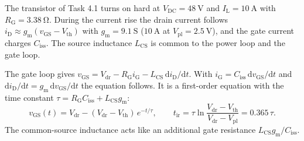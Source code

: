 The transistor of Task 4.1 turns on hard at $V_\mathrm{DC}=\SI{48}{\volt}$ and $I_\mathrm{L}=\SI{10}{\ampere}$ with $R_\mathrm{G}=\SI{3.38}{\ohm}$. During the current rise the drain current follows $i_\mathrm{D}\approx g_\mathrm{m}(v_\mathrm{GS}-V_\mathrm{th})$ with $g_\mathrm{m}=\SI{9.1}{\siemens}$ ($\SI{10}{\ampere}$ at $V_\mathrm{pl}=\SI{2.5}{\volt}$), and the gate current charges $C_\mathrm{iss}$. The source inductance $L_\mathrm{CS}$ is common to the power loop and the gate loop.


\begin{solutionblock}
	The gate loop gives $v_\mathrm{GS}=V_\mathrm{dr}-R_\mathrm{G}i_\mathrm{G}-L_\mathrm{CS}\,\mathrm{d}i_\mathrm{D}/\mathrm{d}t$. With $i_\mathrm{G}=C_\mathrm{iss}\,\mathrm{d}v_\mathrm{GS}/\mathrm{d}t$ and $\mathrm{d}i_\mathrm{D}/\mathrm{d}t=g_\mathrm{m}\,\mathrm{d}v_\mathrm{GS}/\mathrm{d}t$ the equation follows. It is a first-order equation with the time constant $\tau=R_\mathrm{G}C_\mathrm{iss}+L_\mathrm{CS}g_\mathrm{m}$:
	\begin{equation}
		v_\mathrm{GS}(t)=V_\mathrm{dr}-(V_\mathrm{dr}-V_\mathrm{th})\,e^{-t/\tau},\qquad
		t_\mathrm{ir}=\tau\ln\frac{V_\mathrm{dr}-V_\mathrm{th}}{V_\mathrm{dr}-V_\mathrm{pl}}=0.365\,\tau.
	\end{equation}
	The common-source inductance acts like an additional gate resistance $L_\mathrm{CS}g_\mathrm{m}/C_\mathrm{iss}$.
\end{solutionblock}


